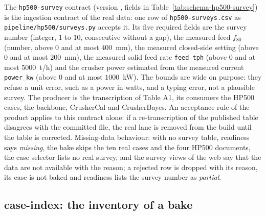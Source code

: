 The \texttt{hp500-survey} contract (version , fields in Table~\ref{tab:schema-hp500-survey}) is the ingestion contract of the real data: one row of
\texttt{hp500-surveys.csv} as \texttt{pipeline/\allowbreak{}hp500/\allowbreak{}surveys.py} accepts it. Its five required fields are the survey number
(integer, $1$ to $10$, consecutive without a gap), the measured feed $f_{80}$ (number, above $0$ and at most $400$~mm), the
measured closed-side setting (above $0$ and at most $200$~mm), the measured solid feed rate \texttt{feed\_tph} (above $0$ and at
most $5000$~t/h) and the crusher power estimated from the measured current \texttt{power\_kw} (above $0$ and at most
$1000$~kW). The bounds are wide on purpose: they refuse a unit error, such as a power in watts, and a typing error, not a
plausible survey. The producer is the transcription of Table A1, its consumers the HP500 cases, the backbone, CrusherCal and
CrusherBayes. An acceptance rule of the product applies to this contract alone: if a re-transcription of the published table
disagrees with the committed file, the real lane is removed from the build until the table is corrected. Missing-data behaviour: with no
survey table, readiness says \emph{missing}, the bake skips the ten real cases and the four HP500 documents, the case selector
lists no real survey, and the survey views of the web say that the data are not available with the reason; a rejected row is
dropped with its reason, its case is not baked and readiness lists the survey number as \emph{partial}.

\subsection{case-index: the inventory of a bake}\label{sec:data-index}

